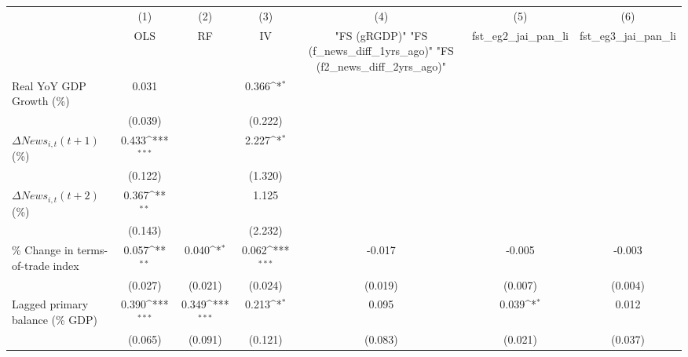{
\def\sym#1{\ifmmode^{#1}\else\(^{#1}\)\fi}
\begin{tabular}{l*{6}{c}}
\toprule
                    &\multicolumn{1}{c}{(1)}&\multicolumn{1}{c}{(2)}&\multicolumn{1}{c}{(3)}&\multicolumn{1}{c}{(4)}&\multicolumn{1}{c}{(5)}&\multicolumn{1}{c}{(6)}\\
                    &\multicolumn{1}{c}{OLS}&\multicolumn{1}{c}{RF}&\multicolumn{1}{c}{IV}&\multicolumn{1}{c}{ "FS (gRGDP)"  "FS (f_news_diff_1yrs_ago)"  "FS (f2_news_diff_2yrs_ago)" }&\multicolumn{1}{c}{fst_eg2_jai_pan_li}&\multicolumn{1}{c}{fst_eg3_jai_pan_li}\\
\midrule
Real YoY GDP Growth (\%)&       0.031         &                     &       0.366\sym{*}  &                     &                     &                     \\
                    &     (0.039)         &                     &     (0.222)         &                     &                     &                     \\
\addlinespace
$ \Delta News_{i,t}(t+1)$ (\%)&       0.433\sym{***}&                     &       2.227\sym{*}  &                     &                     &                     \\
                    &     (0.122)         &                     &     (1.320)         &                     &                     &                     \\
\addlinespace
$ \Delta News_{i,t}(t+2)$ (\%)&       0.367\sym{**} &                     &       1.125         &                     &                     &                     \\
                    &     (0.143)         &                     &     (2.232)         &                     &                     &                     \\
\addlinespace
\% Change in terms-of-trade index&       0.057\sym{**} &       0.040\sym{*}  &       0.062\sym{***}&      -0.017         &      -0.005         &      -0.003         \\
                    &     (0.027)         &     (0.021)         &     (0.024)         &     (0.019)         &     (0.007)         &     (0.004)         \\
\addlinespace
Lagged primary balance (\% GDP)&       0.390\sym{***}&       0.349\sym{***}&       0.213\sym{*}  &       0.095         &       0.039\sym{*}  &       0.012         \\
                    &     (0.065)         &     (0.091)         &     (0.121)         &     (0.083)         &     (0.021)         &     (0.037)         \\

\end{tabular}}
